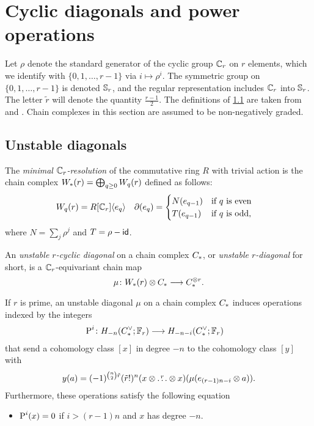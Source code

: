 
\section{Cyclic diagonals and power operations}\label{s:2bdiagonals}

Let $\rho$ denote the standard generator of the cyclic group $\Cyc_r$ on $r$ elements, which we identify with $\{0,1,\dots,r-1\}$ via $i\mapsto \rho^i$.
The symmetric group on $\{0,1,\dots,r-1\}$ is denoted $\Sym_r$, and the regular representation includes $\Cyc_r$ into $\Sym_r$.
The letter $\tilde{r}$ will denote the quantity $\frac{r-1}{2}$.
The definitions of \cref{s:unstable} are taken from \cite{may1970general} and \cite{medina2021may_st}.
Chain complexes in this section are assumed to be non-negatively graded.

\subsection{Unstable diagonals}\label{s:unstable}

The \emph{minimal $\Cyc_r$-resolution} of the commutative ring $R$ with trivial action is the chain complex $\W(r) = \bigoplus_{q \geq 0} \W[q](r)$ defined as follows:
\begin{align*}
	\W[q](r) &= R[\Cyc_r]\langle e_q\rangle &
	\partial(e_q) &= \begin{cases}
		N(e_{q-1}) & \text{if $q$ is even} \\
		T(e_{q-1}) & \text{if $q$ is odd,}
	\end{cases}
\end{align*}
where $N = \sum_j \rho^j$ and $T = \rho - \Id$.

\begin{definition}
	An \emph{unstable $r$-cyclic diagonal} on a chain complex $\ucadenas$, or \emph{unstable $r$-diagonal} for short, is a $\Cyc_r$-equivariant chain map
	\[
	\mu \colon \W(r) \ot \ucadenas \lra \ucadenas^{\ot r}.
	\]
\end{definition}

\begin{proposition}\label{prop:unstable}
	If $r$ is prime, an unstable diagonal $\mu$ on a chain complex $\ucadenas$ induces operations indexed by the integers
	\begin{align*}
		\power^{i} \colon H_{-n}(\ucocadenas;\mathbb{F}_r)& \lra H_{-n-i}(\ucocadenas;\mathbb{F}_r)
	\end{align*}
	that send a cohomology class $[x]$ in degree $-n$ to the cohomology class $[y]$ with
	\[
	y(a) = (-1)^{\binom{n}{2} \tilde{r}}(\tilde{r}!)^n(x \ot \overset{r}{\dots} \ot x)(\mu(e_{(r-1)n-i} \ot a)).
	\]
	Furthermore, these operations satisfy the following equation
	\begin{itemize}
		\item $\power^i(x) = 0$ if $i>(r-1)n$ and $x$ has degree $-n$.
	\end{itemize}
\end{proposition}

